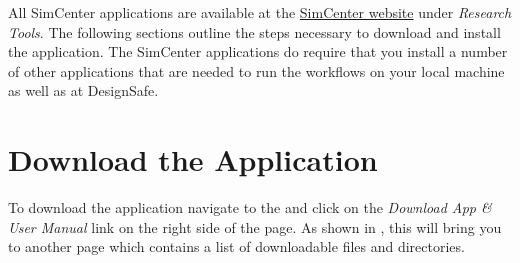 All SimCenter applications are available at
the \href{https://simcenter.designsafe-ci.org/research-tools/overview/}{SimCenter
website} under \emph{Research Tools}. The following sections outline
the steps necessary to download and install the \texttt{\getsoftwarename{}}
application. The SimCenter applications do require that you install a
number of other applications that are needed to run the workflows on
your local machine as well as at DesignSafe. \\


\section{Download the Application}


To download the \texttt{\getsoftwarename{}} application navigate to
the  and click on
the \emph{Download App \& User Manual} link on the right side of the
page. As shown in , this will bring you to another page which contains a list of downloadable files and directories.



